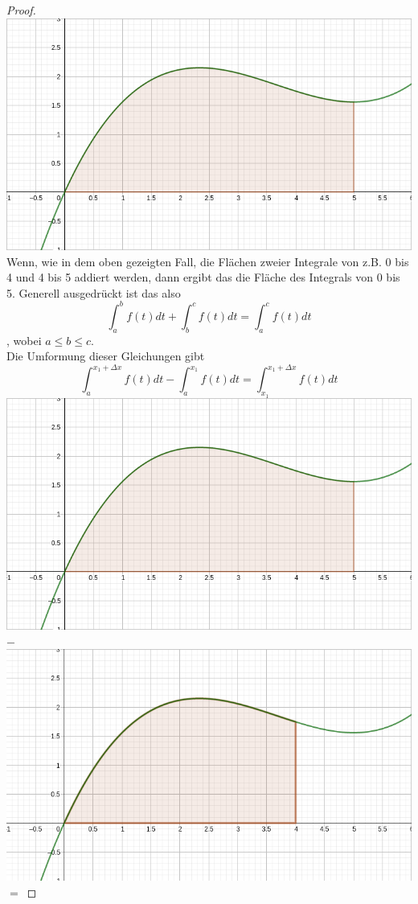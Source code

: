 \documentclass[fontsize=12pt,paper=a4,DIV12,cleardoublepage=empty, 
liststotoc,idxtotoc,bibtotoc]{article}
\theoremstyle{plain}
\theoremstyle{definition}
\begin{document}
\begin{proof}
		\includegraphics[scale=0.2]{Integral 0-5.png} \\
		Wenn, wie in dem oben gezeigten Fall, die Flächen zweier Integrale von z.B. 0 bis 4 und 4 bis 5 addiert werden, dann ergibt das die Fläche des Integrals von 0 bis 5. Generell ausgedrückt ist das also
		\begin{equation*}
			\int_{a}^{b}f(t)dt + \int_{b}^{c}f(t)dt = \int_{a}^{c}f(t)dt
		\end{equation*}
		, wobei $a\leq b\leq c$.\\
		Die Umformung dieser Gleichungen gibt
		\begin{equation*}
			\int_{a}^{x_1+\Delta x}f(t)dt-\int_{a}^{x_1}f(t)dt=\int_{x_1}^{x_1+\Delta x}f(t)dt
		\end{equation*}
		\includegraphics[scale=0.2]{Integral 0-5.png} $-$
		\includegraphics[scale=0.2]{Integral 0-4.png} $=$

\end{proof}
\end{document}

